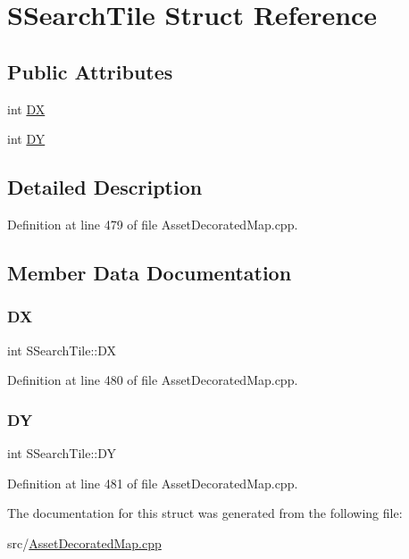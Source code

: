 \hypertarget{structSSearchTile}{}\section{S\+Search\+Tile Struct Reference}
\label{structSSearchTile}
\subsection*{Public Attributes}
\begin{DoxyCompactItemize}
\item 
int \hyperlink{structSSearchTile_a08045e94e80c5c6e98f23313139853c6}{DX}
\item 
int \hyperlink{structSSearchTile_a5a7b0a0b5d8efc7a01175625a012abd1}{DY}
\end{DoxyCompactItemize}


\subsection{Detailed Description}


Definition at line 479 of file Asset\+Decorated\+Map.\+cpp.



\subsection{Member Data Documentation}
\hypertarget{structSSearchTile_a08045e94e80c5c6e98f23313139853c6}{}\label{structSSearchTile_a08045e94e80c5c6e98f23313139853c6} 
\subsubsection{\texorpdfstring{DX}{DX}}
{\footnotesize\ttfamily int S\+Search\+Tile\+::\+DX}



Definition at line 480 of file Asset\+Decorated\+Map.\+cpp.

\hypertarget{structSSearchTile_a5a7b0a0b5d8efc7a01175625a012abd1}{}\label{structSSearchTile_a5a7b0a0b5d8efc7a01175625a012abd1} 
\subsubsection{\texorpdfstring{DY}{DY}}
{\footnotesize\ttfamily int S\+Search\+Tile\+::\+DY}



Definition at line 481 of file Asset\+Decorated\+Map.\+cpp.



The documentation for this struct was generated from the following file\+:\begin{DoxyCompactItemize}
\item 
src/\hyperlink{AssetDecoratedMap_8cpp}{Asset\+Decorated\+Map.\+cpp}\end{DoxyCompactItemize}
